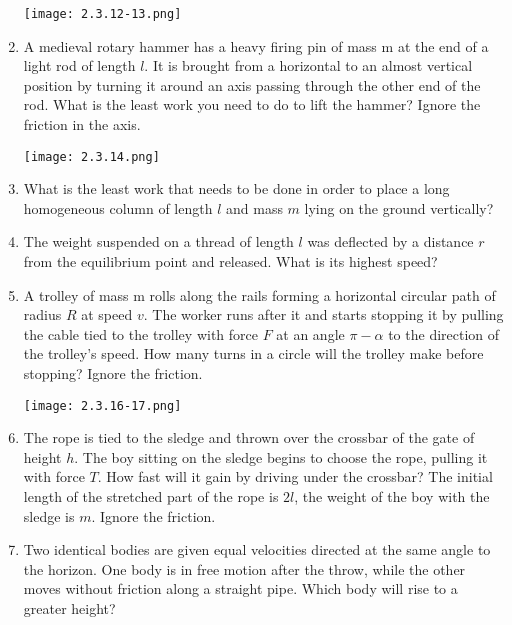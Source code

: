 \documentclass{article}
\begin{document}
\begin{enumerate}[label=2.3.\arabic*]
\begin{center}
    \texttt{[image: 2.3.12-13.png]}
\end{center}


\item A medieval rotary hammer has a heavy firing pin of mass m at the end of a light rod of length $l$. It is brought from a horizontal to an almost vertical position by turning it around an axis passing through the other end of the rod. What is the least work you need to do to lift the hammer? Ignore the friction in the axis.

\begin{center}
    \texttt{[image: 2.3.14.png]}
\end{center}


\item What is the least work that needs to be done in order to place a long homogeneous column of length $l$ and mass $m$ lying on the ground vertically?

\item The weight suspended on a thread of length $l$ was deflected by a distance $r$ from the equilibrium point and released. What is its highest speed?

\item A trolley of mass m rolls along the rails forming a horizontal circular path of radius $R$ at speed $v$. The worker runs after it and starts stopping it by pulling the cable tied to the trolley with force $F$ at an angle $\pi - \alpha$ to the direction of the trolley's speed. How many turns in a circle will the trolley make before stopping? Ignore the friction.

\begin{center}
    \texttt{[image: 2.3.16-17.png]}
\end{center}


\item The rope is tied to the sledge and thrown over the crossbar of the gate of height $h$. The boy sitting on the sledge begins to choose the rope, pulling it with force $T$. How fast will it gain by driving under the crossbar? The initial length of the stretched part of the rope is $2l$, the weight of the boy with the sledge is $m$. Ignore the friction.

\item Two identical bodies are given equal velocities directed at the same angle to the horizon. One body is in free motion after the throw, while the other moves without friction along a straight pipe. Which body will rise to a greater height?


\end{enumerate}
\end{document}
